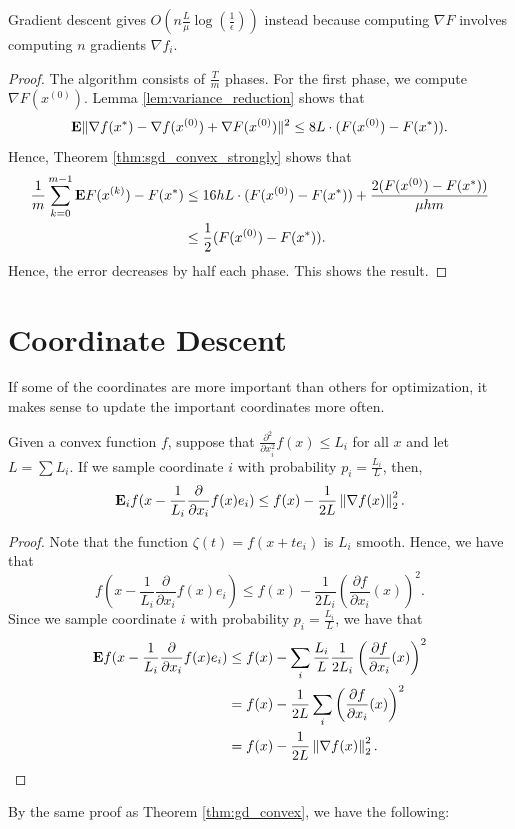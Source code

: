\begin{rem*}
Gradient descent gives $O(n\frac{L}{\mu}\log(\frac{1}{\epsilon}))$
instead because computing $\nabla F$ involves computing $n$ gradients
$\nabla f_{i}$.
\end{rem*}
\begin{proof}
The algorithm consists of $\frac{T}{m}$ phases. For the first phase,
we compute $\nabla F(x^{(0)})$. Lemma \ref{lem:variance_reduction}
shows that 
\[
\mathbf{E}\|\nabla f(x^{*})-\nabla f(x^{(0)})+\nabla F(x^{(0)})\|^{2}\leq8L\cdot(F(x^{(0)})-F(x^{*})).
\]
Hence, Theorem \ref{thm:sgd_convex_strongly} shows that
\begin{align*}
\frac{1}{m}\sum^{m-1}_{k=0}\mathbf{E} F(x^{(k)})-F(x^{*}) & \leq16hL\cdot(F(x^{(0)})-F(x^{*}))+\frac{2(F(x^{(0)})-F(x^{*}))}{\mu hm}\\
 & \leq\frac{1}{2}(F(x^{(0)})-F(x^{*})).
\end{align*}
Hence, the error decreases by half each phase. This shows the result.
\end{proof}

\section{Coordinate Descent}

If some of the coordinates are more important than others for optimization,
it makes sense to update the important coordinates more often.
\begin{lem}
\label{lem:coordinate_descent}Given a convex function $f$, suppose
that $\frac{\partial^{2}}{\partial x^{2}_{i}}f(x)\leq L_{i}$ for
all $x$ and let $L=\sum L_{i}$. If we sample coordinate $i$ with
probability $p_{i}=\frac{L_{i}}{L}$, then, 
\[
\mathbf{E}_{i}f(x-\frac{1}{L_{i}}\frac{\partial}{\partial x_{i}}f(x)e_{i})\leq f(x)-\frac{1}{2L}\left\Vert \nabla f(x)\right\Vert^{2}_{2}.
\]
\end{lem}

\begin{proof}
Note that the function $\zeta(t)=f(x+te_{i})$ is $L_{i}$ smooth.
Hence, we have that
\[
f(x-\frac{1}{L_{i}}\frac{\partial}{\partial x_{i}}f(x)e_{i})\leq f(x)-\frac{1}{2L_{i}}\left(\frac{\partial f}{\partial x_{i}}(x)\right)^{2}.
\]
Since we sample coordinate $i$ with probability $p_{i}=\frac{L_{i}}{L}$,
we have that
\begin{align*}
\mathbf{E} f(x-\frac{1}{L_{i}}\frac{\partial}{\partial x_{i}}f(x)e_{i}) & \le f(x)-\sum_{i}\frac{L_{i}}{L}\frac{1}{2L_{i}}\left(\frac{\partial f}{\partial x_{i}}(x)\right)^{2}\\
 & =f(x)-\frac{1}{2L}\sum_{i}\left(\frac{\partial f}{\partial x_{i}}(x)\right)^{2}\\
 & =f(x)-\frac{1}{2L}\left\Vert \nabla f(x)\right\Vert^{2}_{2}.
\end{align*}
\end{proof}
By the same proof as Theorem \ref{thm:gd_convex}, we have the following:

